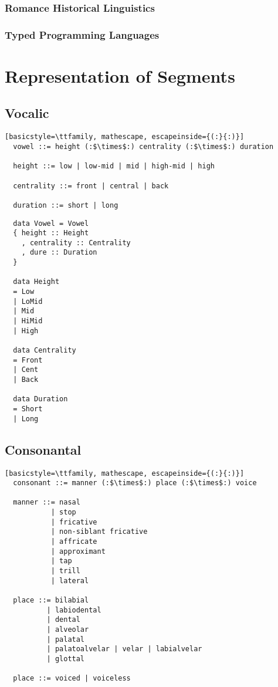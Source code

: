 \documentclass{report}
\begin{document}
\subsection*{Romance Historical Linguistics}

\subsection*{Typed Programming Languages}

\chapter{Representation of Segments}


\section{Vocalic}

\begin{lstlisting}[basicstyle=\ttfamily, mathescape, escapeinside={(:}{:)}]
  vowel ::= height (:$\times$:) centrality (:$\times$:) duration

  height ::= low | low-mid | mid | high-mid | high

  centrality ::= front | central | back

  duration ::= short | long
\end{lstlisting}

\begin{verbatim}
  data Vowel = Vowel
  { height :: Height
    , centrality :: Centrality
    , dure :: Duration
  }

  data Height
  = Low
  | LoMid
  | Mid
  | HiMid
  | High

  data Centrality
  = Front
  | Cent
  | Back

  data Duration
  = Short
  | Long
\end{verbatim}

\section{Consonantal}

\begin{lstlisting}[basicstyle=\ttfamily, mathescape, escapeinside={(:}{:)}]
  consonant ::= manner (:$\times$:) place (:$\times$:) voice

  manner ::= nasal
           | stop
           | fricative
           | non-siblant fricative
           | affricate
           | approximant
           | tap
           | trill
           | lateral

  place ::= bilabial
          | labiodental
          | dental
          | alveolar
          | palatal
          | palatoalvelar | velar | labialvelar
          | glottal

  place ::= voiced | voiceless
\end{lstlisting}
\end{document}
